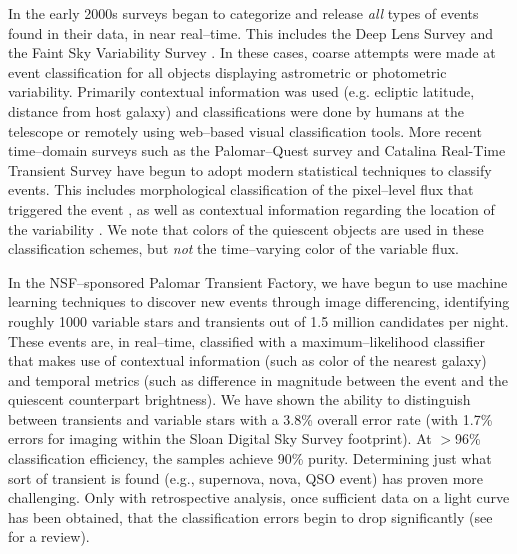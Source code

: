
In the early 2000s surveys began to categorize and release {\it all} types of
events found in their data, in near real--time. This includes the Deep Lens
Survey \citep{2004ApJ...611..418B} and the Faint Sky Variability Survey
\citep{2003MNRAS.339..427G}.  In these cases, coarse attempts were made at event
classification for all objects displaying astrometric or photometric
variability. Primarily contextual information was used (e.g. ecliptic latitude,
distance from host galaxy) and classifications were done by humans at the
telescope or remotely using web--based visual classification tools.  More recent
time--domain surveys such as the Palomar--Quest survey
\citep{2008AN....329..263D} and Catalina Real-Time Transient Survey
\citep{2011arXiv1102.5004D} have begun to adopt modern statistical techniques to
classify events.  This includes morphological classification of the pixel--level
flux that triggered the event \citep{2008AIPC.1082..252D}, as well as contextual
information regarding the location of the variability
\citep{2010ASPC..434..115M}.  We note that colors of the quiescent objects are
used in these classification schemes, but {\it not} the time--varying color of
the variable flux.


In the NSF--sponsored Palomar Transient Factory, we have begun to use machine
learning techniques to discover new events through image differencing,
identifying roughly 1000 variable stars and transients out of 1.5 million
candidates per night. These events are, in real--time, classified with a
maximum--likelihood classifier that makes use of contextual information (such as
color of the nearest galaxy) and temporal metrics (such as difference in
magnitude between the event and the quiescent counterpart brightness).  We have
shown \citep{2011arXiv1106.5491B} the ability to distinguish between transients
and variable stars with a 3.8\% overall error rate (with 1.7\% errors for
imaging within the Sloan Digital Sky Survey footprint).  At $>$96\%
classification efficiency, the samples achieve 90\% purity.  Determining just
what sort of transient is found (e.g., supernova, nova, QSO event) has proven
more challenging.  Only with retrospective analysis, once sufficient data on a
light curve has been obtained, that the classification errors begin to drop
significantly \citep{2011ApJ...733...10R} (see \citealt{2011arXiv1104.3142B} for
a review).

